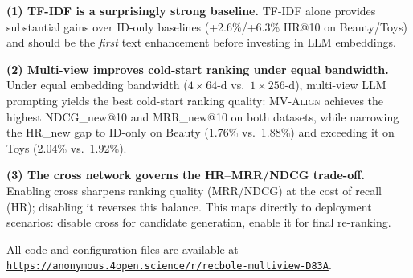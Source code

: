 \documentclass[sigconf,natbib=true,anonymous]{acmart}
\newcommand{\model}{\textsc{MV-Align}\xspace}
\newcommand{\tfidf}{\textsc{TF-IDF}\xspace}
\newcommand{\llm}{\textsc{LLM}\xspace}
\begin{document}
\textbf{(1) TF-IDF is a surprisingly strong baseline.}
\tfidf alone provides substantial gains over ID-only baselines
(+2.6\%/+6.3\% HR@10 on Beauty/Toys) and should be the
\emph{first} text enhancement before investing in \llm embeddings.

\textbf{(2) Multi-view improves cold-start ranking under equal bandwidth.}
Under equal embedding bandwidth ($4{\times}64$-d vs.\ $1{\times}256$-d),
multi-view \llm prompting yields the best cold-start ranking quality:
\model achieves the highest NDCG\_new@10 and MRR\_new@10 on both
datasets, while narrowing the HR\_new gap to ID-only on Beauty
(1.76\% vs.\ 1.88\%) and exceeding it on Toys
(2.04\% vs.\ 1.92\%).

\textbf{(3) The cross network governs the HR--MRR/NDCG trade-off.}
Enabling cross sharpens ranking quality (MRR/NDCG) at the cost of
recall (HR); disabling it reverses this balance. This maps directly
to deployment scenarios: disable cross for candidate generation,
enable it for final re-ranking.

\smallskip\noindent
All code and configuration files are available at
\texttt{\url{https://anonymous.4open.science/r/recbole-multiview-D83A}}.

\balance



\end{document}
